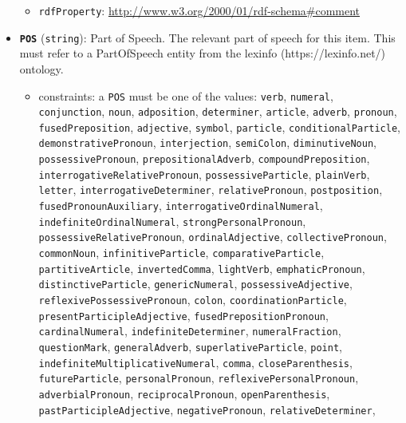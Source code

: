 \begin{itemize}
  \begin{itemize}
  \tightlist
  \item
    \texttt{rdfProperty}:
    \url{http://www.w3.org/2000/01/rdf-schema\#comment}
  \end{itemize}
\item
  \textbf{\texttt{POS}} (\texttt{string}): Part of Speech. The relevant
  part of speech for this item. This must refer to a PartOfSpeech entity
  from the lexinfo (https://lexinfo.net/) ontology.

  \begin{itemize}
  \item
    constraints: a \texttt{POS} must be one of the values:
    \texttt{verb}, \texttt{numeral}, \texttt{conjunction},
    \texttt{noun}, \texttt{adposition}, \texttt{determiner},
    \texttt{article}, \texttt{adverb}, \texttt{pronoun},
    \texttt{fusedPreposition}, \texttt{adjective}, \texttt{symbol},
    \texttt{particle}, \texttt{conditionalParticle},
    \texttt{demonstrativePronoun}, \texttt{interjection},
    \texttt{semiColon}, \texttt{diminutiveNoun},
    \texttt{possessivePronoun}, \texttt{prepositionalAdverb},
    \texttt{compoundPreposition}, \texttt{interrogativeRelativePronoun},
    \texttt{possessiveParticle}, \texttt{plainVerb}, \texttt{letter},
    \texttt{interrogativeDeterminer}, \texttt{relativePronoun},
    \texttt{postposition}, \texttt{fusedPronounAuxiliary},
    \texttt{interrogativeOrdinalNumeral},
    \texttt{indefiniteOrdinalNumeral}, \texttt{strongPersonalPronoun},
    \texttt{possessiveRelativePronoun}, \texttt{ordinalAdjective},
    \texttt{collectivePronoun}, \texttt{commonNoun},
    \texttt{infinitiveParticle}, \texttt{comparativeParticle},
    \texttt{partitiveArticle}, \texttt{invertedComma},
    \texttt{lightVerb}, \texttt{emphaticPronoun},
    \texttt{distinctiveParticle}, \texttt{genericNumeral},
    \texttt{possessiveAdjective}, \texttt{reflexivePossessivePronoun},
    \texttt{colon}, \texttt{coordinationParticle},
    \texttt{presentParticipleAdjective},
    \texttt{fusedPrepositionPronoun}, \texttt{cardinalNumeral},
    \texttt{indefiniteDeterminer}, \texttt{numeralFraction},
    \texttt{questionMark}, \texttt{generalAdverb},
    \texttt{superlativeParticle}, \texttt{point},
    \texttt{indefiniteMultiplicativeNumeral}, \texttt{comma},
    \texttt{closeParenthesis}, \texttt{futureParticle},
    \texttt{personalPronoun}, \texttt{reflexivePersonalPronoun},
    \texttt{adverbialPronoun}, \texttt{reciprocalPronoun},
    \texttt{openParenthesis}, \texttt{pastParticipleAdjective},
    \texttt{negativePronoun}, \texttt{relativeDeterminer},

\end{itemize}
\end{itemize}
